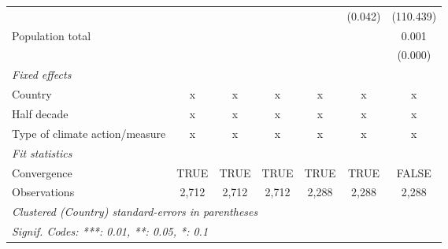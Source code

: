 \begin{tabular}{lcccccc}
                                                        &               &              &               &               & (0.042)       & (110.439)\\   
   Population total                                     &               &              &               &               &               & 0.001\\   
                                                        &               &              &               &               &               & (0.000)\\   
   \emph{Fixed effects}\\
   Country                                              & x             & x            & x             & x             & x             & x\\  
   Half decade                                          & x             & x            & x             & x             & x             & x\\  
   Type of climate action/measure                       & x             & x            & x             & x             & x             & x\\  
   \midrule \emph{Fit statistics}\\
   Convergence                                          &TRUE           & TRUE         & TRUE          & TRUE          & TRUE          & FALSE\\  
   Observations                                         & 2,712         & 2,712        & 2,712         & 2,288         & 2,288         & 2,288\\  
   \midrule
   \multicolumn{7}{l}{\emph{Clustered (Country) standard-errors in parentheses}}\\
   \multicolumn{7}{l}{\emph{Signif. Codes: ***: 0.01, **: 0.05, *: 0.1}}\\
\end{tabular}
\par\endgroup


